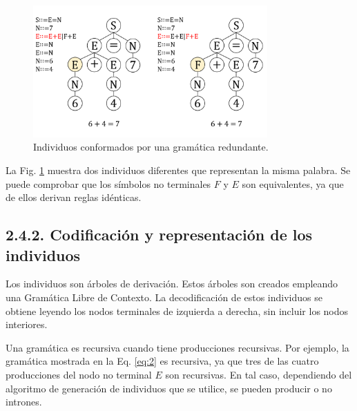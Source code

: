 \documentclass[spanish,a4paper,12pt,twoside]{report}
\begin{document}
    \begin{figure}[H]
      \centering
      \includegraphics[width = 0.8\textwidth]{resources/Fig6.pdf}
      \caption{Individuos conformados por una gramática redundante.}
      \label{fig:6}
    \end{figure} \par
    La Fig. \ref{fig:6} muestra dos individuos diferentes que representan la misma palabra. Se puede comprobar que los símbolos no terminales $F$ y $E$ son equivalentes, ya que de ellos derivan reglas idénticas. \par
    
    \subsection*{\large 2.4.2. Codificación y representación de los individuos}
    Los individuos son árboles de derivación. Estos árboles son creados empleando una Gramática Libre de Contexto. La decodificación de estos individuos se obtiene leyendo los nodos terminales de izquierda a derecha, sin incluir los nodos interiores. \par
    Una gramática es recursiva cuando tiene producciones recursivas. Por ejemplo, la gramática mostrada en la Eq. \ref{eq:2} es recursiva, ya que tres de las cuatro producciones del nodo no terminal $E$ son recursivas. En tal caso, dependiendo del algoritmo de generación de individuos que se utilice, se pueden producir o no intrones. 
    
\end{document}
